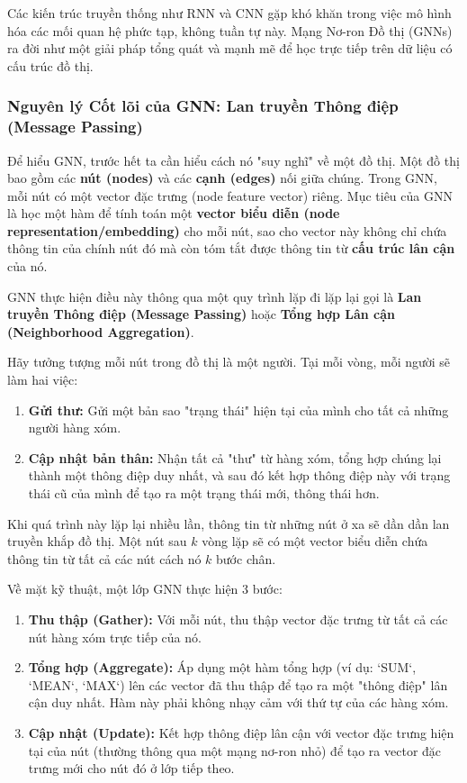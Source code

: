 Các kiến trúc truyền thống như RNN và CNN gặp khó khăn trong việc mô hình hóa các mối quan hệ phức tạp, không tuần tự này. Mạng Nơ-ron Đồ thị (GNNs) \cite{scarselli2009graph, kipf2016semi} ra đời như một giải pháp tổng quát và mạnh mẽ để học trực tiếp trên dữ liệu có cấu trúc đồ thị.

\subsubsection{Nguyên lý Cốt lõi của GNN: Lan truyền Thông điệp (Message Passing)}
\label{ssec:gnn_message_passing}

Để hiểu GNN, trước hết ta cần hiểu cách nó "suy nghĩ" về một đồ thị. Một đồ thị bao gồm các \textbf{nút (nodes)} và các \textbf{cạnh (edges)} nối giữa chúng. Trong GNN, mỗi nút có một vector đặc trưng (node feature vector) riêng. Mục tiêu của GNN là học một hàm để tính toán một \textbf{vector biểu diễn (node representation/embedding)} cho mỗi nút, sao cho vector này không chỉ chứa thông tin của chính nút đó mà còn tóm tắt được thông tin từ \textbf{cấu trúc lân cận} của nó.

GNN thực hiện điều này thông qua một quy trình lặp đi lặp lại gọi là \textbf{Lan truyền Thông điệp (Message Passing)} hoặc \textbf{Tổng hợp Lân cận (Neighborhood Aggregation)}.

\begin{tcolorbox}[
    title=Trực giác về Lan truyền Thông điệp,
    colback=green!5!white, colframe=green!60!black, fonttitle=\bfseries
]
Hãy tưởng tượng mỗi nút trong đồ thị là một người. Tại mỗi vòng, mỗi người sẽ làm hai việc:
\begin{enumerate}
    \item \textbf{Gửi thư:} Gửi một bản sao "trạng thái" hiện tại của mình cho tất cả những người hàng xóm.
    \item \textbf{Cập nhật bản thân:} Nhận tất cả "thư" từ hàng xóm, tổng hợp chúng lại thành một thông điệp duy nhất, và sau đó kết hợp thông điệp này với trạng thái cũ của mình để tạo ra một trạng thái mới, thông thái hơn.
\end{enumerate}
Khi quá trình này lặp lại nhiều lần, thông tin từ những nút ở xa sẽ dần dần lan truyền khắp đồ thị. Một nút sau $k$ vòng lặp sẽ có một vector biểu diễn chứa thông tin từ tất cả các nút cách nó $k$ bước chân.
\end{tcolorbox}

Về mặt kỹ thuật, một lớp GNN thực hiện 3 bước:
\begin{enumerate}
    \item \textbf{Thu thập (Gather):} Với mỗi nút, thu thập vector đặc trưng từ tất cả các nút hàng xóm trực tiếp của nó.
    \item \textbf{Tổng hợp (Aggregate):} Áp dụng một hàm tổng hợp (ví dụ: `SUM`, `MEAN`, `MAX`) lên các vector đã thu thập để tạo ra một "thông điệp" lân cận duy nhất. Hàm này phải không nhạy cảm với thứ tự của các hàng xóm.
    \item \textbf{Cập nhật (Update):} Kết hợp thông điệp lân cận với vector đặc trưng hiện tại của nút (thường thông qua một mạng nơ-ron nhỏ) để tạo ra vector đặc trưng mới cho nút đó ở lớp tiếp theo.
\end{enumerate}


